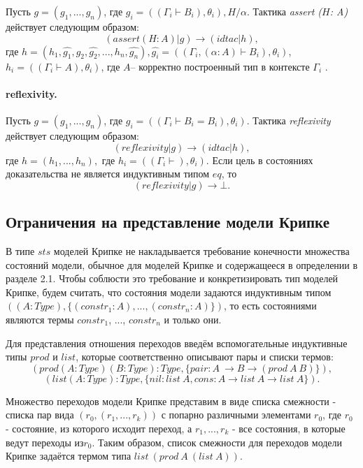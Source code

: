 \documentclass[12pt]{article}
\begin{document}
Пусть $g = (g_1, ..., g_n)$, где $g_i = ((\Gamma_i \vdash B_i), \theta_i), H/\alpha$.
Тактика \textit{assert ($H$: A)}  действует следующим образом:
$$(assert (H:A)|g) \xrightarrow{} (idtac| h),$$ 
где $h=(h_1,\hat{g_1},g_2,\hat{g_2},...,h_n,\hat{g_n}), \hat{g_i} = ((\Gamma_i, (\alpha:A) \vdash B_i), \theta_i)$,${h_i} = ((\Gamma_i \vdash A), \theta_i)$, где $A$-- корректно построенный тип в контексте $\Gamma_i$ .

\paragraph{reflexivity.}
Пусть $g = (g_1, ..., g_n)$, где $g_i = ((\Gamma_i \vdash B_i=B_i), \theta_i)$.
Тактика \textit{reflexivity}  действует следующим образом:
$$(reflexivity|g) \xrightarrow{} (idtac| h),$$ 
где $h=(h_1, ...,h_n),$ где $h_i= ((\Gamma_i \vdash), \theta_i)$.
Если цель в состояниях доказательства не является индуктивным типом $eq$, то 
$$(reflexivity|g) \xrightarrow{} \bot.$$ 

\subsection{Ограничения на представление модели Крипке}




В типе $sts$ моделей Крипке не накладывается требование конечности множества состояний модели, обычное для моделей Крипке и содержащееся в определении в разделе 2.1.
Чтобы соблюсти это требование и конкретизировать тип моделей Крипке, будем считать, что состояния модели задаются индуктивным типом $((A : Type), \{(constr_1 : A), ..., (constr_n : A)\})$, то есть состояниями являются термы $constr_1$, ..., $constr_n$ и только они.

Для представления отношения переходов введём вспомогательные индуктивные типы $prod$ и $list$, которые соответственно описывают пары и списки термов:
$$(prod (A:Type) (B:Type):Type, \{ pair:A\ \xrightarrow{} B \xrightarrow{} (prod\ A\ B)\}),$$
$$(list (A : Type) : Type, \{ nil : list\ A, cons : A \xrightarrow{} list\ A \xrightarrow{} list\ A \}).$$

Множество переходов модели Крипке представим в виде списка смежности - списка пар вида $(r_0, (r_1, ..., r_k))$ с попарно различными элементами $r_0$, где $r_0$ - состояние, из которого исходит переход, а $r_1, ..., r_k$ - все состояния, в которые ведут переходы из$ r_0$.
Таким образом, список смежности для переходов модели Крипке задаётся термом типа $list\ (prod\ A\ (list\ A))$.
\end{document}
